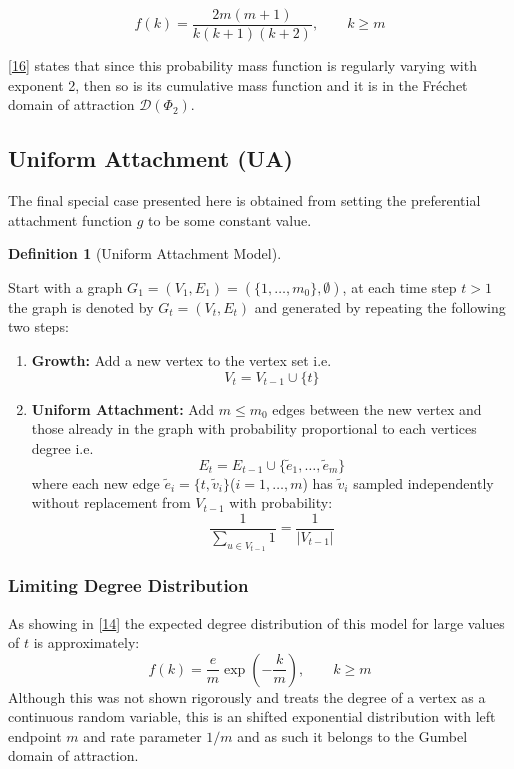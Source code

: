 \documentclass[
  10pt,
  a4paper,
]{scrreprt}
\providecommand{\tightlist}{%
  \setlength{\itemsep}{0pt}\setlength{\parskip}{0pt}}\usepackage{longtable,booktabs,array}
\theoremstyle{definition}
\newtheorem{definition}{Definition}[section]
\theoremstyle{plain}
\theoremstyle{plain}
\theoremstyle{remark}
\begin{document}
{\[
f(k) = \frac{2m(m+1)}{k(k+1)(k+2)}, \qquad k\geq m
\]

{[}\protect\hyperlink{ref-bing89}{16}{]} states that since this
probability mass function is regularly varying with exponent 2, then so
is its cumulative mass function and it is in the Fréchet domain of
attraction \(\mathcal D(\Phi_2)\).

\hypertarget{uniform-attachment-ua}{%
\subsection{Uniform Attachment (UA)}\label{uniform-attachment-ua}}

The final special case presented here is obtained from setting the
preferential attachment function \(g\) to be some constant value.

\begin{definition}[Uniform Attachment
Model]\protect\hypertarget{def-ua}{}\label{def-ua}

Start with a graph \(G_1 = (V_1, E_1) = (\{1,\ldots,m_0\}, \emptyset)\),
at each time step \(t>1\) the graph is denoted by \(G_t=(V_t, E_t)\) and
generated by repeating the following two steps:

\begin{enumerate}
\def\labelenumi{\arabic{enumi}.}
\tightlist
\item
  \textbf{Growth:} Add a new vertex to the vertex set i.e.~\[
  V_t=V_{t-1}\cup\{t\}
  \]
\item
  \textbf{Uniform Attachment:} Add \(m\le m_0\) edges between the new
  vertex and those already in the graph with probability proportional to
  each vertices degree i.e.~\[
  E_t  = E_{t-1} \cup \{\tilde e_1, \ldots, \tilde e_m\}
  \] where each new edge
  \(\tilde e_i = \{t, \tilde v_i\}\)(\(i=1,\ldots, m\)) has
  \(\tilde v_i\) sampled independently without replacement from
  \(V_{t-1}\) with probability: \[
  \frac{1}{\sum_{u\in V_{t-1}}1} = \frac{1}{|V_{t-1}|}
  \]
\end{enumerate}

\end{definition}

\hypertarget{limiting-degree-distribution-2}{%
\subsubsection{Limiting Degree
Distribution}\label{limiting-degree-distribution-2}}

As showing in {[}\protect\hyperlink{ref-Barabasi99}{14}{]} the expected
degree distribution of this model for large values of \(t\) is
approximately: \[
f(k) = \displaystyle\frac{e}{m}\exp\left(-\displaystyle\frac{k}{m}\right),\qquad k \ge m
\] Although this was not shown rigorously and treats the degree of a
vertex as a continuous random variable, this is an shifted exponential
distribution with left endpoint \(m\) and rate parameter \(1/m\) and as
such it belongs to the Gumbel domain of attraction.

}
\end{document}
